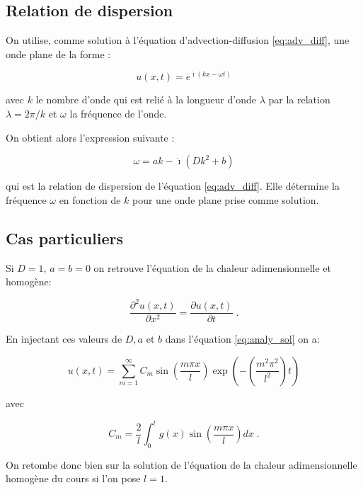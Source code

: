 \documentclass[a4paper, 12pt]{report}
\begin{document}
\subsection*{Relation de dispersion}

On utilise, comme solution à l'équation d'advection-diffusion \eqref{eq:adv_diff}, une onde plane de la forme :

\begin{equation}
  u(x,t) = e^{\dot{\imath}\left(kx-\omega t\right)}
\end{equation}

avec $k$ le nombre d'onde qui est relié à la longueur d'onde $\lambda$ par la relation $\lambda = 2\pi/k$ et $\omega$ la fréquence de l'onde.

On obtient alors l'expression suivante :

\begin{equation}
  \omega = ak-\dot{\imath}\left(Dk^{2}+b\right)
	\label{eq:dispersion}
\end{equation}

qui est la relation de dispersion de l'équation \eqref{eq:adv_diff}. Elle détermine la fréquence $\omega$ en fonction de $k$ pour une onde plane prise comme solution.

\subsection*{Cas particuliers}

Si $D=1$, $a=b=0$ on retrouve l'équation de la chaleur adimensionnelle et homogène:

\begin{equation}
  \frac{\partial^2 u(x,t)}{\partial x^2} = \frac{\partial u(x,t)}{\partial t}\;.
\end{equation}

En injectant ces valeurs de $D,a$ et $b$ dans l'équation \eqref{eq:analy_sol} on a:

 \begin{equation}
   u(x,t) = \sum_{m=1}^{\infty} C_m \sin \left (\frac{m \pi x}{l} \right ) \exp \left ( - \left (\frac{m^2 \pi^2}{l^2} \right ) t \right )
 \end{equation}

 avec

 \begin{equation}
   C_m = \frac{2}{l} \int_0^l g(x) \sin \left (\frac{m \pi x}{l} \right )  dx \;.
 \end{equation}

 On retombe donc bien sur la solution de l'équation de la chaleur adimensionnelle
 homogène du cours si l'on pose $l=1$.
\end{document}
